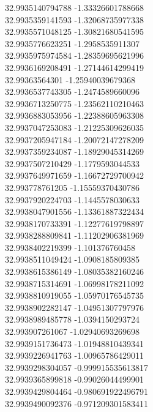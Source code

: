 {32.9935140794788	-1.33326601788668\\
32.9935359141593	-1.32068735977338\\
32.9935571048125	-1.30821680541595\\
32.9935776623251	-1.2958535911307\\
32.9935975974584	-1.28359695621996\\
32.9936169208491	-1.27144614299419\\
32.99363564301	-1.25940039679368\\
32.9936537743305	-1.2474589660096\\
32.9936713250775	-1.23562110210463\\
32.9936883053956	-1.22388605963308\\
32.9937047253083	-1.21225309626035\\
32.9937205947184	-1.20072147278209\\
32.9937359234087	-1.18929045314269\\
32.9937507210429	-1.1779593044533\\
32.9937649971659	-1.16672729700942\\
32.993778761205	-1.15559370430786\\
32.9937920224703	-1.1445578030633\\
32.9938047901556	-1.13361887322434\\
32.9938170733391	-1.12277619798897\\
32.9938288809841	-1.11202906381969\\
32.9938402219399	-1.101376760458\\
32.9938511049424	-1.0908185809385\\
32.9938615386149	-1.08035382160246\\
32.9938715314691	-1.06998178211092\\
32.9938810919055	-1.05970176545735\\
32.9938902282147	-1.04951307797976\\
32.9938989485778	-1.0394150293724\\
32.993907261067	-1.02940693269698\\
32.9939151736473	-1.01948810439341\\
32.9939226941763	-1.00965786429011\\
32.9939298304057	-0.999915535613817\\
32.9939365899818	-0.99026044499901\\
32.9939429804464	-0.980691922496791\\
32.9939490092376	-0.971209301583411\\
}
